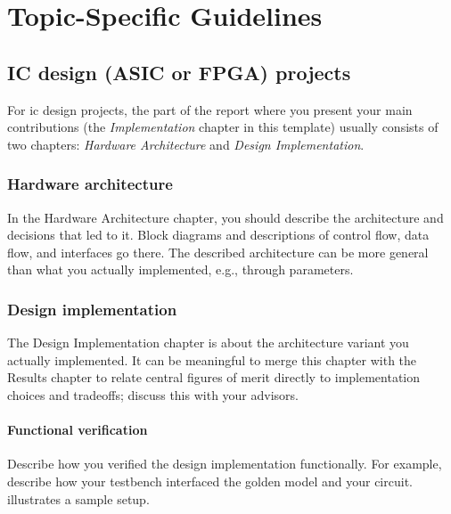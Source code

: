 \chapter{Topic-Specific Guidelines}
\label{app:topic-specific_guidelines}

\section{IC design (ASIC or FPGA) projects}

    For \gls{ic} design projects, the part of the report where you present your main contributions (the \textsl{Implementation} chapter in this template) usually consists of two chapters: \textsl{Hardware Architecture} and \textsl{Design Implementation}.

  \subsection{Hardware architecture}

    In the Hardware Architecture chapter, you should describe the architecture and decisions that led to it.
    Block diagrams and descriptions of control flow, data flow, and interfaces go there.
    The described architecture can be more general than what you actually implemented, e.g., through parameters.

  \subsection{Design implementation}

    The Design Implementation chapter is about the architecture variant you actually implemented.
    It can be meaningful to merge this chapter with the Results chapter to relate central figures of merit directly to implementation choices and tradeoffs; discuss this with your advisors.

    \subsubsection{Functional verification}

      Describe how you verified the design implementation functionally.
      For example, describe how your testbench interfaced the golden model and your circuit.
       illustrates a sample setup.


